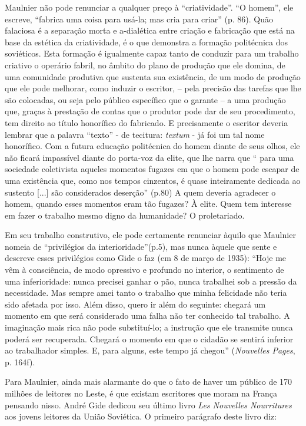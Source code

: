 Maulnier não pode renunciar a qualquer preço à ``criatividade''. ``O
homem'', ele escreve, ``fabrica uma coisa para usá-la; mas cria para
criar'' (p. 86). Quão falaciosa é a separação morta e a-dialética entre
criação e fabricação que está na base da estética da criatividade, é o
que demonstra a formação politécnica dos soviéticos. Esta formação é
igualmente capaz tanto de conduzir para um trabalho criativo o operário
fabril, no âmbito do plano de produção que ele domina, de uma comunidade
produtiva que sustenta sua existência, de um modo de produção que ele
pode melhorar, como induzir o escritor, -- pela precisão das tarefas que
lhe são colocadas, ou seja pelo público específico que o garante -- a
uma produção que, graças à prestação de contas que o produtor pode dar
de seu procedimento, tem direito ao título honorífico do fabricado. E
precisamente o escritor deveria lembrar que a palavra ``texto'' - de
tecitura: \emph{textum} - já foi um tal nome honorífico. Com a futura
educação politécnica do homem diante de seus olhos, ele não ficará
impassível diante do porta-voz da elite, que lhe narra que `` para uma
sociedade coletivista aqueles momentos fugazes em que o homem pode
escapar de uma existência que, como nos tempos cinzentos, é quase
inteiramente dedicada ao sustento {[}...{]} são considerados deserção''
(p.80) A quem deveria agradecer o homem, quando esses momentos eram tão
fugazes? À elite. Quem tem interesse em fazer o trabalho mesmo digno da
humanidade? O proletariado.

Em seu trabalho construtivo, ele pode certamente renunciar àquilo que
Maulnier nomeia de ``privilégios da interioridade''(p.5), mas nunca
àquele que sente e descreve esses privilégios como Gide o faz (em 8 de
março de 1935): ``Hoje me vêm à consciência, de modo opressivo e
profundo no interior, o sentimento de uma inferioridade: nunca precisei
ganhar o pão, nunca trabalhei sob a pressão da necessidade. Mas sempre
amei tanto o trabalho que minha felicidade não teria sido afetada por
isso. Além disso, quero ir além do seguinte: chegará um momento em que
será considerado uma falha não ter conhecido tal trabalho. A imaginação
mais rica não pode substituí-lo; a instrução que ele transmite nunca
poderá ser recuperada. Chegará o momento em que o cidadão se sentirá
inferior ao trabalhador simples. E, para alguns, este tempo já chegou''
(\emph{Nouvelles Pages}, p. 164f).

Para Maulnier, ainda mais alarmante do que o fato de haver um público de
170 milhões de leitores no Leste, é que existam escritores que moram na
França pensando nisso. André Gide dedicou seu último livro \emph{Les
Nouvelles Nourritures} aos jovens leitores da União Soviética. O
primeiro parágrafo deste livro diz:

